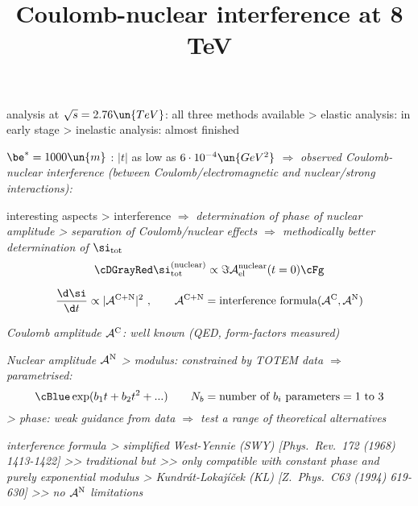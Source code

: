 \vskip-6mm

\> analysis at $\sqrt s = 2.76\un{TeV}$: all three methods available
\>> elastic analysis: in early stage
\>> inelastic analysis: almost finished

\newpage %
\title{Coulomb-nuclear interference at 8 TeV}

\> $\be^* = 1000\un{m}$ : \cBlack $|t|$ as low as $6\cdot10^{-4}\un{GeV^2}$ $\Rightarrow$ \em{observed Coulomb-nuclear interference}
\cBlack (between Coulomb/electromagnetic and nuclear/strong interactions):

\vfil
{}

\vskip-5mm

\> interesting aspects
\>> interference $\Rightarrow$ \em{determination of phase} of nuclear amplitude
\>> separation of Coulomb/nuclear effects $\Rightarrow$ \em{methodically better determination of $\si_{\rm tot}$}
$$\cDGrayRed\si_{\rm tot}^{\rm(nuclear)} \propto \Im {\cal A_{\rm el}^{\rm nuclear}}(t = 0)\cFg$$


\newpage %

\vskip-3mm

\cBlue
$${\d\si\over \d t} \propto |{\cal A}^{\rm C+N}|^2\ ,\qquad
{\cal A}^{\rm C+N} = \hbox{interference formula}({\cal A^{\rm C}}, {\cal A}^{\rm N})$$
\vskip1mm

\> \em{Coulomb amplitude ${\cal A}^{\rm C}$}: well known (QED, form-factors measured)

\> \em{Nuclear amplitude ${\cal A}^{\rm N}$}
\>> \em{modulus}: constrained by TOTEM data $\Rightarrow$ parametrised:
$$\cBlue\exp(b_1 t + b_2 t^2 + ...)\qquad N_b = \hbox{number of $b_i$ parameters} = 1 \hbox{ to }3$$
\>> \em{phase}: weak guidance from data $\Rightarrow$ test a range of theoretical alternatives 

\> \em{interference formula}
\>> \cBlue simplified West-Yennie \cBlack(SWY) [Phys.~Rev.~172 (1968) 1413-1422]
\>>> traditional but
\>>> only compatible with constant phase and purely exponential modulus
\>> \cBlue Kundrát-Lokajíček \cBlack(KL) [Z.~Phys.~C63 (1994) 619-630]
\>>> no ${\cal A}^{\rm N}$ limitations

\vfil

\centerline{}


